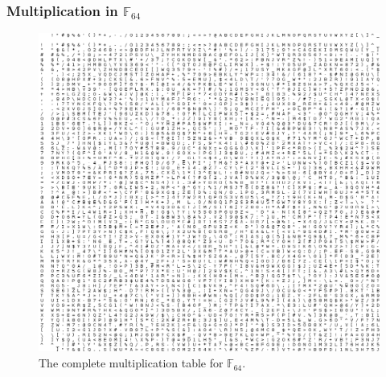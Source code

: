\documentclass{beamer}
\begin{document}
\begin{frame}
	\frametitle{Multiplication in $\mathbb{F}_{64}$}

	\begin{figure}
	\includegraphics[height=0.7\textheight]{MultTable.png}
	\caption{The complete multiplication table for $\mathbb{F}_{64}$.}
	\label{fig:MultTable}
	\end{figure}

\end{frame}
\end{document}
